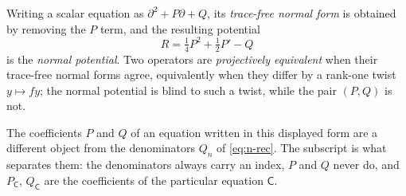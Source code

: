 Writing a scalar equation as $\partial^2+P\partial+Q$, its \emph{trace-free
normal form} is obtained by removing the $P$ term, and the resulting potential
\[
  R=\tfrac14P^2+\tfrac12P'-Q
\]
is the \emph{normal potential}. Two operators are \emph{projectively
equivalent} when their trace-free normal forms agree, equivalently when they
differ by a rank-one twist $y\mapsto fy$; the normal potential is blind to such
a twist, while the pair $(P,Q)$ is not.

The coefficients $P$ and $Q$ of an equation written in this displayed form are
a different object from the denominators $Q_n$ of \eqref{eq:n-rec}. The
subscript is what separates them: the denominators always carry an index,
$P$ and $Q$ never do, and $P_{\mathsf C}$, $Q_{\mathsf C}$ are the
coefficients of the particular equation $\mathsf C$.

